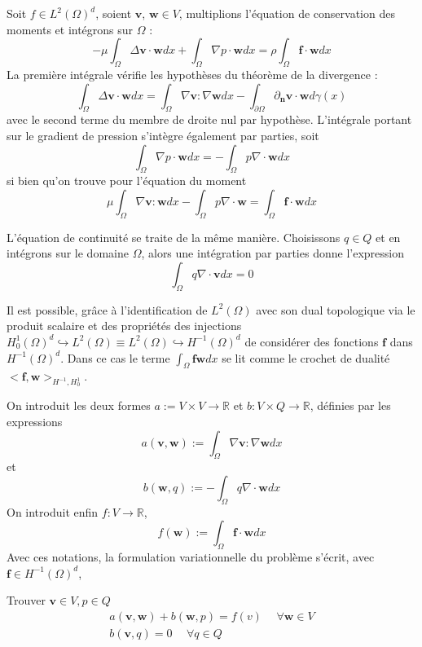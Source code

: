Soit $f \in L^2(\Omega)^d$, soient $\mathbf{v}$, $\mathbf{w} \in V$, multiplions l'équation de conservation des moments et intégrons sur $\Omega$ : $$ -\mu \int_{\Omega} \Delta \mathbf{v} \cdot \mathbf{w} dx + \int_\Omega \nabla p \cdot \mathbf{w} dx = \rho \int_\Omega \mathbf{f} \cdot \mathbf{w} dx $$ La première intégrale vérifie les hypothèses du théorème de la divergence : $$ \int_\Omega \Delta \mathbf{v} \cdot \mathbf{w} dx = \int_\Omega \nabla \mathbf{v} : \nabla \mathbf{w} dx - \int_{\partial \Omega} \partial_{\mathbf{n}} \mathbf{v} \cdot \mathbf{w} d\gamma(x) $$ avec le second terme du membre de droite nul par hypothèse. L'intégrale portant sur le gradient de pression s'intègre également par parties, soit $$ \int_\Omega \nabla p \cdot \mathbf{w} dx = - \int_\Omega p \nabla \cdot \mathbf{w} dx $$ si bien qu'on trouve pour l'équation du moment $$ \mu \int_\Omega \nabla \mathbf{v} : \mathbf{w} dx - \int_\Omega p \nabla \cdot \mathbf{w} = \int_\Omega \mathbf{f} \cdot \mathbf{w} dx $$

L'équation de continuité se traite de la même manière. Choisissons $q \in Q$ et en intégrons sur le domaine $\Omega$, alors une intégration par parties donne l'expression $$ \int_\Omega q \nabla \cdot \mathbf{v} dx = 0 $$

Il est possible, grâce à l'identification de $L^2(\Omega)$ avec son dual topologique via le produit scalaire et des propriétés des injections $H^1_0(\Omega)^d \hookrightarrow L^2(\Omega) \equiv L^2(\Omega) \hookrightarrow H^{-1}(\Omega)^d$ de considérer des fonctions $\mathbf{f}$ dans $H^{-1}(\Omega)^d$. Dans ce cas le terme $\int_\Omega \mathbf{f} \mathbf{w} dx$ se lit comme le crochet de dualité $< \mathbf{f}, \mathbf{w} >_{H^{-1}, H^1_0}$.

On introduit les deux formes $ a := V \times V \rightarrow \mathbb{R} $ et $ b: V \times Q \rightarrow \mathbb{R} $, définies par les expressions $$ a(\mathbf{v}, \mathbf{w}) := \int_\Omega \nabla \mathbf{v} : \nabla \mathbf{w} dx $$ et $$ b(\mathbf{w}, q) := -\int_\Omega q \nabla \cdot \mathbf{w} dx $$ On introduit enfin $f : V \rightarrow \mathbb{R}$, $$ f(\mathbf{w}) := \int_\Omega \mathbf{f} \cdot \mathbf{w} dx $$ Avec ces notations, la formulation variationnelle du problème s'écrit, avec $\mathbf{f} \in H^{-1}(\Omega)^d$,

Trouver $\mathbf{v} \in V, p \in Q$
\begin{align*}
     a(\mathbf{v}, \mathbf{w}) + b(\mathbf{w}, p) = f(v) \hspace{15pt} \forall \mathbf{w} \in V \\
     b(\mathbf{v}, q) = 0 \hspace{15pt} \forall q \in Q
\end{align*}

